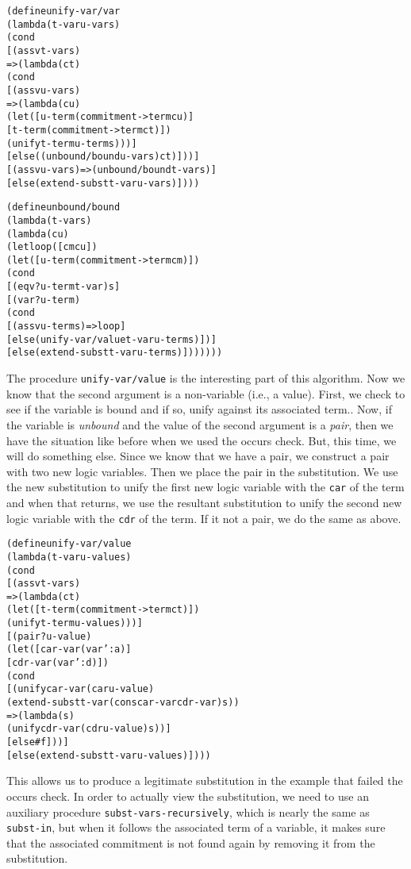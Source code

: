 \begin{alltt}
(define unify-var/var
  (lambda (t-var u-var s)
    (cond
      [(assv t-var s)
       => (lambda (ct)
            (cond
              [(assv u-var s)
               => (lambda (cu)
                    (let ([u-term (commitment->term cu)]
                          [t-term (commitment->term ct)])
                      (unify t-term u-term s)))]
              [else ((unbound/bound u-var s) ct)]))]
      [(assv u-var s) => (unbound/bound t-var s)]
      [else (extend-subst t-var u-var s)])))
\end{alltt}
\newpage
\begin{alltt}
(define unbound/bound
  (lambda (t-var s)
    (lambda (cu)
      (let loop ([cm cu])
        (let ([u-term (commitment->term cm)])
          (cond
            [(eqv? u-term t-var) s]
            [(var? u-term)
             (cond
               [(assv u-term s) => loop]
               [else (unify-var/value t-var u-term s)])]
            [else (extend-subst t-var u-term s)]))))))
\end{alltt}
The procedure \texttt{unify-var/value} is the interesting
part of this algorithm.  Now we know that the second argument
is a non-variable (i.e., a value).  First, we check to see
if the variable is bound and if so, unify against its associated term..
Now, if the variable is \emph{unbound} and the value of the
second argument is a \emph{pair}, then we have the situation
like before when we used the occurs check.  But, this time,
we will do something else.  Since we know that we have a pair,
we construct a pair with two new logic variables.  Then we
place the pair in the substitution.  We use the new substitution
to unify the first new logic variable with the \texttt{car} of
the term and when that returns, we use the resultant substitution
to unify the second new logic variable with the \texttt{cdr} of
the term.  If it not a pair, we do the same as above.

\begin{alltt}
(define unify-var/value
  (lambda (t-var u-value s)
    (cond
      [(assv t-var s)
       => (lambda (ct)
            (let ([t-term (commitment->term ct)]) 
              (unify t-term u-value s)))]
      [(pair? u-value)
       (let ([car-var (var ':a)]
             [cdr-var (var ':d)])
         (cond
           [(unify car-var (car u-value)
              (extend-subst t-var (cons car-var cdr-var) s))
            => (lambda (s)
                 (unify cdr-var (cdr u-value) s))]
           [else #f]))]
      [else (extend-subst t-var u-value s)])))
\end{alltt}
This allows us to produce a legitimate substitution in the example
that failed the occurs check.  In order to actually view the
substitution, we need to use an auxiliary procedure
\texttt{subst-vars-recursively}, which is nearly the same as
\texttt{subst-in}, but when it follows the associated term of a
variable, it makes sure that the associated commitment is not found
again by removing it from the substitution.

